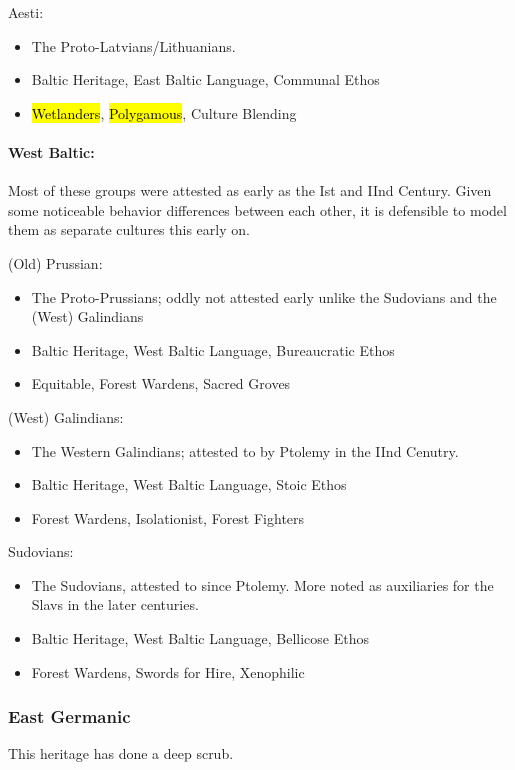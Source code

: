\documentclass{article}
\begin{document}
	Aesti:
	\begin{itemize}
		\item The Proto-Latvians/Lithuanians.
		\item Baltic Heritage, East Baltic Language, Communal Ethos
		\item \hl{Wetlanders}, \hl{Polygamous}, Culture Blending
	\end{itemize}
	
	\paragraph{West Baltic:}
	Most of these groups were attested as early as the Ist and IInd Century.
	Given some noticeable behavior differences between each other, it is defensible to model them as separate cultures this early on.
	
	(Old) Prussian:
	\begin{itemize}
		\item The Proto-Prussians; oddly not attested early unlike the Sudovians and the (West) Galindians
		\item Baltic Heritage, West Baltic Language, Bureaucratic Ethos
		\item Equitable, Forest Wardens, Sacred Groves
	\end{itemize}
	
	(West) Galindians:
	\begin{itemize}
		\item The Western Galindians; attested to by Ptolemy in the IInd Cenutry.
		\item Baltic Heritage, West Baltic Language, Stoic Ethos
		\item Forest Wardens, Isolationist, Forest Fighters
	\end{itemize}
	
	Sudovians:
	\begin{itemize}
		\item The Sudovians, attested to since Ptolemy. More noted as auxiliaries for the Slavs in the later centuries.
		\item Baltic Heritage, West Baltic Language, Bellicose Ethos
		\item Forest Wardens, Swords for Hire, Xenophilic
	\end{itemize}
	
	\subsubsection{East Germanic}
	This heritage has done a deep scrub.
	
\end{document}
